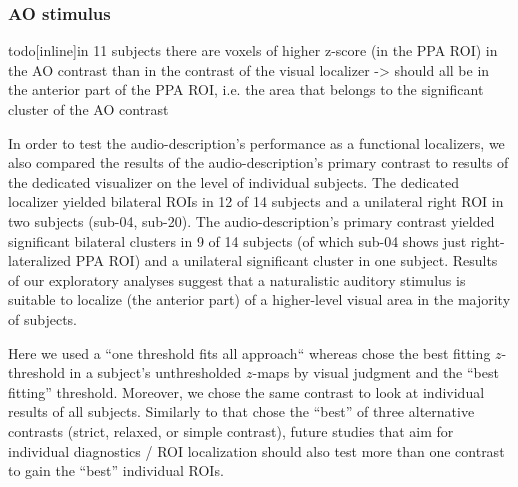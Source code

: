 \documentclass[english]{article}
\begin{document}
\subsubsection{AO stimulus}



todo[inline]{in 11 subjects there are voxels of higher z-score (in the PPA ROI)
    in the AO contrast than in the contrast of the visual localizer -> should
    all be in the anterior part of the PPA ROI, i.e. the area that belongs to
    the significant cluster of the AO contrast}



In order to test the audio-description's performance as a functional localizers,
we also compared the results of the audio-description's primary contrast to
results of the dedicated visualizer on the level of individual subjects.
The dedicated localizer \citep{sengupta2016extension} yielded bilateral ROIs in
12 of 14 subjects and a unilateral right ROI in two subjects (sub-04, sub-20).
The audio-description's primary contrast yielded significant bilateral clusters
in 9 of 14 subjects (of which sub-04 shows just right-lateralized PPA ROI)  and
a unilateral significant cluster in one subject.
Results of our exploratory analyses suggest that a naturalistic auditory
stimulus is suitable to localize (the anterior part) of a higher-level visual
area in the majority of subjects.

Here we used a ``one threshold fits all approach`` whereas
\citep{sengupta2016extension} chose the best fitting $z$-threshold in a
subject's unthresholded $z$-maps by visual judgment and the ``best fitting''
threshold.
Moreover, we chose the same contrast to look at individual results of all
subjects.
Similarly to \citep{sengupta2016extension} that chose the ``best'' of three
alternative contrasts (strict, relaxed, or simple contrast), future studies that
aim for individual diagnostics / ROI localization should also test more than one
contrast to gain the ``best'' individual ROIs.
\end{document}
